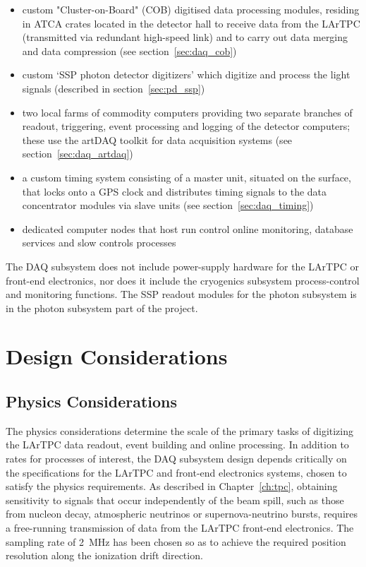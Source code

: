 \begin{itemize}
  \item custom "Cluster-on-Board" (COB) digitised data processing
    modules, residing in ATCA crates located in the detector hall to
    receive data from the LArTPC (transmitted via redundant high-speed
    link) and to carry out data merging and data compression (see
    section~\ref{sec:daq_cob})
  \item custom `SSP photon detector digitizers' which digitize and
    process the light signals (described in section~\ref{sec:pd_ssp}) 
  \item two local farms of commodity computers providing two separate
    branches of readout, triggering, event processing and logging of the
    detector computers; these use the artDAQ toolkit for data
    acquisition systems (see section~\ref{sec:daq_artdaq})
  \item a custom timing system consisting of a master unit, situated
    on the surface, that locks onto a GPS clock and distributes timing
    signals to the data concentrator modules via slave units (see
    section~\ref{sec:daq_timing})
  \item dedicated computer nodes that host run control online
    monitoring, database services and slow controls processes
\end{itemize}
%
The DAQ subsystem does not include power-supply hardware for the
LArTPC or front-end electronics, nor does it include the cryogenics
subsystem process-control and monitoring functions.  The SSP readout
modules for the photon subsystem is in the photon subsystem part of
the project.

\section{Design Considerations}

\subsection{Physics Considerations}

The physics considerations determine the scale of the primary tasks of
digitizing the LArTPC data readout, event building and online
processing.  In addition to rates for processes of interest, the DAQ
subsystem design depends critically on the specifications for the
LArTPC and front-end electronics systems, chosen to satisfy the \LBNE
physics requirements.  As described in Chapter~\ref{ch:tpc}, obtaining
sensitivity to signals that occur independently of the \LBNE beam
spill, such as those from nucleon decay, atmospheric neutrinos or
supernova-neutrino bursts, requires a free-running transmission of
data from the LArTPC front-end electronics.  The sampling rate of
2~MHz has been chosen so as to achieve the required position
resolution along the ionization drift direction.

